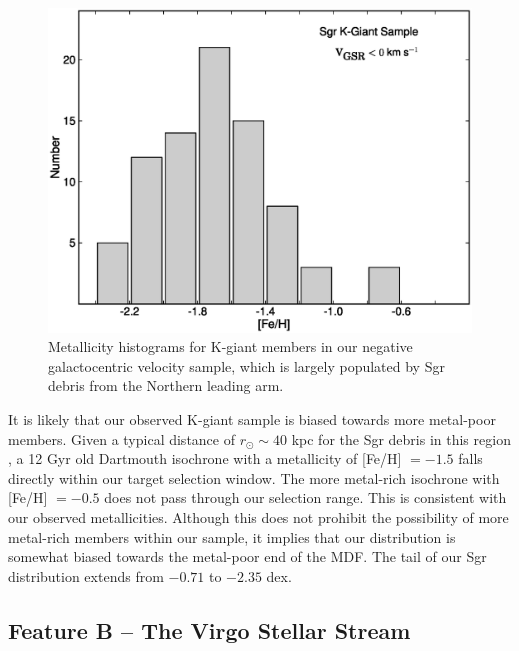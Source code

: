 \documentclass[preprint2]{aastex}
\begin{document}
	\begin{figure}[h]
		\includegraphics[width=\columnwidth]{./sgr_feh_hist.eps}
		\caption{Metallicity histograms for K-giant members in our negative galactocentric velocity sample, which is largely populated by Sgr debris from the Northern leading arm.}
		\label{fig:sgr-metallicity-hist}
	\end{figure}

	It is likely that our observed K-giant sample is biased towards more metal-poor members. Given a typical distance of $r_\odot\sim 40$ kpc for the Sgr debris in this region \citep{Belokurov;et-al_2006}, a 12 Gyr old Dartmouth \citep{Dotter;et-al_2008} isochrone with a metallicity of [Fe/H] $= -1.5$ falls directly within our target selection window. The more metal-rich isochrone with [Fe/H] $= -0.5$ does not pass through our selection range. This is consistent with our observed metallicities. Although this does not prohibit the possibility of more metal-rich members within our sample, it implies that our distribution is somewhat biased towards the metal-poor end of the MDF. The tail of our Sgr distribution extends from $-0.71$ to $-2.35$ dex.

	\subsection{Feature B \--- The Virgo Stellar Stream}
	\label{sec:the-vss}
	
\end{document}
